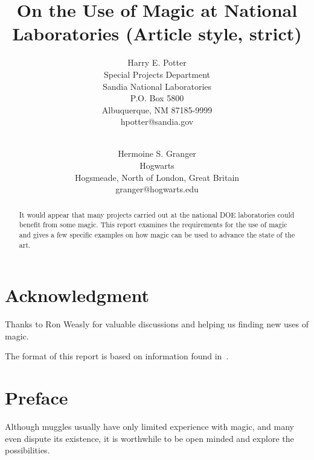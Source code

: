 \documentclass[pdf,ps2pdf,12pt,strict,OUO]{SANDreport}
\title{On the Use of Magic at National Laboratories (Article style, strict)}
\author{Harry E. Potter \\
	  Special Projects Department \\
	  Sandia National Laboratories\\
	  P.O. Box 5800\\
	  Albuquerque, NM 87185-9999 \\
	  hpotter@sandia.gov \\
	  \\
	  \and
	  Hermoine S. Granger \\
	  Hogwarts \\
	  Hogsmeade, North of London, Great Britain\\
	  granger@hogwarts.edu
	 }
\date{}
\begin{document}
    \maketitle

    \begin{abstract}
	It would appear that many projects carried out at the
	national DOE laboratories could benefit from some magic. This
	report examines the requirements for the use of magic and
	gives a few specific examples on how magic can be used to
	advance the state of the art.
    \end{abstract}


    \clearpage
    \section*{Acknowledgment}
	Thanks to Ron Weasly for valuable discussions and helping
	us finding new uses of magic.

	The format of this report is based on information found
	in~\cite{Sand98-0730}.



    \cleardoublepage		%
    \tableofcontents
    \listoffigures
    \listoftables


    \clearpage
    \section*{Preface}
	Although muggles usually have only limited experience with
	magic, and many even dispute its existence, it is worthwhile
	to be open minded and explore the possibilities.
\end{document}
